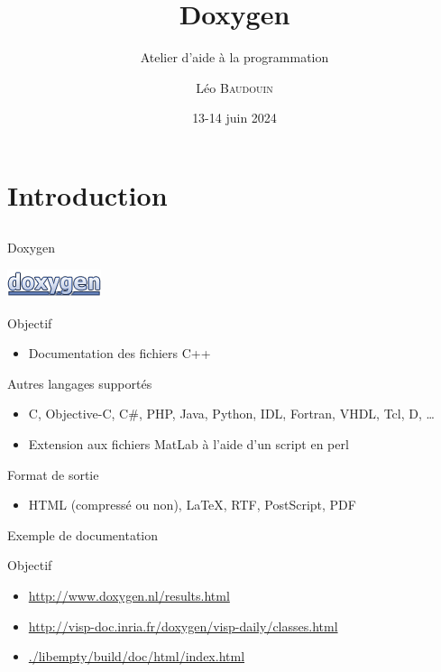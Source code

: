 \documentclass{beamer}
\title{Doxygen}
\subtitle{Atelier d'aide à la programmation}
\author{L\'eo \textsc{Baudouin}}
\institute{
  {\url{baudouin.leo @ gmail.com}}
}
\date{13-14 juin 2024}
\begin{document}
\begin{frame}
  \titlepage
\end{frame}

\section{Introduction}
\subsection{}

\begin{frame}{Doxygen}

\begin{center}
\includegraphics[width=0.3\linewidth]{images/doxygen-logo}
\end{center}

\begin{exampleblock}{Objectif}
\begin{itemize}
\item Documentation des fichiers C++
\end{itemize}
\end{exampleblock}

\begin{block}{Autres langages supportés}
\begin{itemize}
\item C, Objective-C, C\#, PHP, Java, Python, IDL, Fortran, VHDL, Tcl, D, \dots
\item Extension aux fichiers MatLab à l'aide d'un script en perl
\end{itemize}
\end{block}

\begin{block}{Format de sortie}
\begin{itemize}
\item HTML (compressé ou non), \LaTeX, RTF, PostScript, PDF
\end{itemize}
\end{block}
\end{frame}


\begin{frame}{Exemple de documentation}
\begin{block}{Objectif}
\begin{itemize}
\item \url{http://www.doxygen.nl/results.html}
\item \url{http://visp-doc.inria.fr/doxygen/visp-daily/classes.html}
\item \url{./libempty/build/doc/html/index.html}
\end{itemize}
\end{block}
\end{frame}
\end{document}

